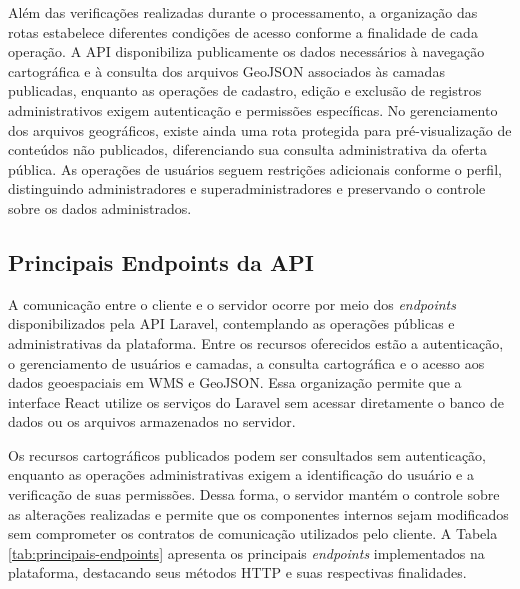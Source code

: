 Além das verificações realizadas durante o processamento, a organização das rotas estabelece diferentes condições de acesso conforme a finalidade de cada operação. A API disponibiliza publicamente os dados necessários à navegação cartográfica e à consulta dos arquivos GeoJSON associados às camadas publicadas, enquanto as operações de cadastro, edição e exclusão de registros administrativos exigem autenticação e permissões específicas. No gerenciamento dos arquivos geográficos, existe ainda uma rota protegida para pré-visualização de conteúdos não publicados, diferenciando sua consulta administrativa da oferta pública. As operações de usuários seguem restrições adicionais conforme o perfil, distinguindo administradores e superadministradores e preservando o controle sobre os dados administrados.


\subsection{Principais Endpoints da API}
\label{sec:endpoints-api}

A comunicação entre o cliente e o servidor ocorre por meio dos \textit{endpoints} disponibilizados pela API Laravel, contemplando as operações públicas e administrativas da plataforma. Entre os recursos oferecidos estão a autenticação, o gerenciamento de usuários e camadas, a consulta cartográfica e o acesso aos dados geoespaciais em WMS e GeoJSON. Essa organização permite que a interface React utilize os serviços do Laravel sem acessar diretamente o banco de dados ou os arquivos armazenados no servidor.

Os recursos cartográficos publicados podem ser consultados sem autenticação, enquanto as operações administrativas exigem a identificação do usuário e a verificação de suas permissões. Dessa forma, o servidor mantém o controle sobre as alterações realizadas e permite que os componentes internos sejam modificados sem comprometer os contratos de comunicação utilizados pelo cliente. A Tabela \ref{tab:principais-endpoints} apresenta os principais \textit{endpoints} implementados na plataforma, destacando seus métodos HTTP e suas respectivas finalidades.

